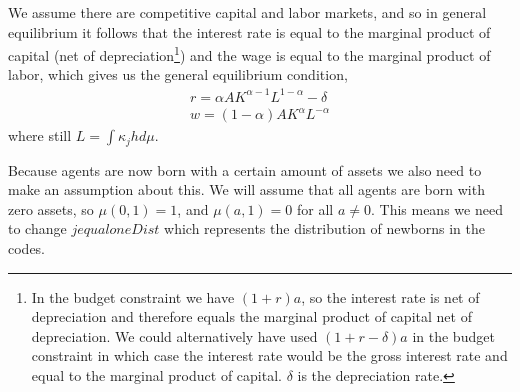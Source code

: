 We assume there are competitive capital and labor markets, and so in general equilibrium it follows that the interest rate is equal to the marginal product of capital (net of depreciation\footnote{In the budget constraint we have $(1+r)a$, so the interest rate is net of depreciation and therefore equals the marginal product of capital net of depreciation. We could alternatively have used $(1+r-\delta)a$ in the budget constraint in which case the interest rate would be the gross interest rate and equal to the marginal product of capital. $\delta$ is the depreciation rate.}) and the wage is equal to the marginal product of labor, which gives us the general equilibrium condition,
\begin{eqnarray*}
 r=\alpha A K^{\alpha-1} L^{1-\alpha}-\delta \\
 w=(1-\alpha)A K^{\alpha} L^{-\alpha}
\end{eqnarray*}
where still $L= \int \kappa_j h d\mu$.

Because agents are now born with a certain amount of assets we also need to make an assumption about this. We will assume that all agents are born with zero assets, so $\mu(0,1)=1$, and $\mu(a,1)=0$ for all $a \neq 0$. This means we need to change $jequaloneDist$ which represents the distribution of newborns in the codes.

